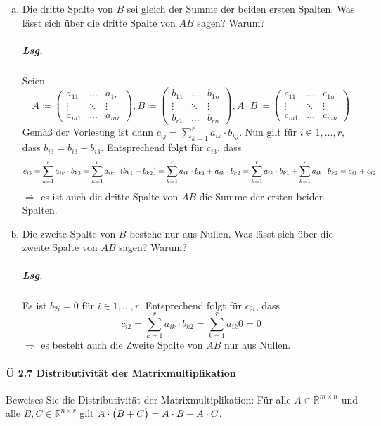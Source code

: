 \documentclass{scrreprt}
\begin{document}
\begin{enumerate}[(a)]
\item Die dritte Spalte von $B$ sei gleich der Summe der beiden ersten Spalten.
  Was lässt sich über die dritte Spalte von $AB$ sagen?
  Warum?

  \subparagraph{Lsg.} Seien
  \[
    A \coloneqq \begin{pmatrix}
      a_{11} & \ldots & a_{1r} \\
      \vdots & \ddots & \vdots \\
      a_{m1} & \ldots & a_{mr}
    \end{pmatrix},
    B \coloneqq \begin{pmatrix}
      b_{11} & \ldots & b_{1n} \\
      \vdots & \ddots & \vdots \\
      b_{r1} & \ldots & b_{rn}
    \end{pmatrix},
    A \cdot B \coloneqq \begin{pmatrix}
      c_{11} & \ldots & c_{1n} \\
      \vdots & \ddots & \vdots \\
      c_{m1} & \ldots & c_{mn}
    \end{pmatrix}
  \]
  Gemäß der Vorlesung ist dann
  $c_{ij} = \sum_{k = 1}^r a_{ik} \cdot b_{kj}$.
  Nun gilt für $i \in 1, \ldots, r$, dass $b_{i3} = b_{i3} + b_{i3}$.
  Entsprechend folgt für $c_{i3}$, dass
  \[
    c_{i3} = \sum_{k = 1}^r a_{ik} \cdot b_{k3} =
    \sum_{k = 1}^r a_{ik} \cdot \qty(b_{k1} + b_{k2}) =
    \sum_{k = 1}^r a_{ik} \cdot b_{k1} + a_{ik} \cdot b_{k2} =
    \sum_{k = 1}^r a_{ik} \cdot b_{k1} + \sum_{k = 1}^r a_{ik} \cdot b_{k2} =
    c_{i1} + c_{i2}
  \]
  $\Rightarrow$ es ist auch die dritte Spalte von $AB$ die Summe der ersten
  beiden Spalten.

\item Die zweite Spalte von $B$ bestehe nur aus Nullen.
  Was lässt sich über die zweite Spalte von $AB$ sagen?
  Warum?

  \subparagraph{Lsg.} Es ist $b_{2i} = 0$ für $i \in 1, \ldots, r$.
  Entsprechend folgt für $c_{2i}$, dass
  \[
    c_{i2} = \sum_{k = 1}^r a_{ik} \cdot b_{k2} =
    \sum_{k = 1}^r a_{ik} 0 = 0
  \]
  $\Rightarrow$ es besteht auch die Zweite Spalte von $AB$ nur aus Nullen.
\end{enumerate}

\newpage
\paragraph{Ü 2.7 Distributivität der Matrixmultiplikation}
Beweises Sie die Distributivität der Matrixmultiplikation:
Für alle $A \in \mathbb{R}^{m \times n}$ und alle
$B, C \in \mathbb{R}^{n \times r}$ gilt
$A \cdot \qty\big(B + C) = A \cdot B + A \cdot C$.
\end{document}
